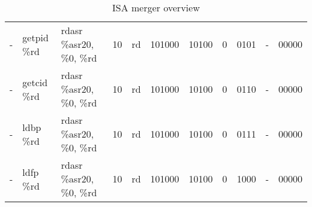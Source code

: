 \documentclass[a4paper,11pt]{article}
\begin{document}
\begin{landscape}
\begin{table}
\begin{center}
{\begin{tabular}{|>{\ttfamily}l|>{\ttfamily}l|>{\ttfamily}l||c|c|c|c|c|c|c|c|}
- & getpid \%rd & rdasr \%asr20, \%0, \%rd & 10&rd&101000&10100&0&0101&-&00000\\
- & getcid \%rd & rdasr \%asr20, \%0, \%rd & 10&rd&101000&10100&0&0110&-&00000\\
- & ldbp \%rd & rdasr \%asr20, \%0, \%rd & 10&rd&101000&10100&0&0111&-&00000\\
- & ldfp \%rd & rdasr \%asr20, \%0, \%rd & 10&rd&101000&10100&0&1000&-&00000\\
\hline
\end{tabular}
\caption{\label{tab:isa-merge}ISA merger overview}
}\end{center}
\end{table}
\end{landscape}
\end{document}
